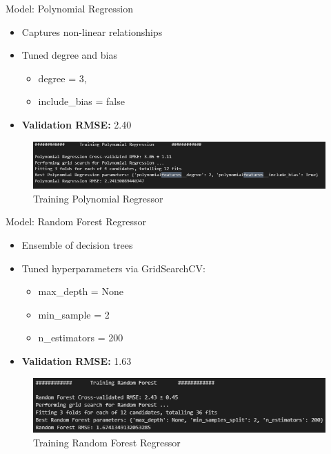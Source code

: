 \documentclass{beamer}
\begin{document}
\begin{frame}{Model: Polynomial Regression}
  \begin{itemize}
    \item Captures non-linear relationships
    \item Tuned degree and bias 
        \begin{itemize}
            \item degree = 3,
            \item include\_bias = false
        \end{itemize}  
    \item \textbf{Validation RMSE:} 2.40
  \end{itemize}
  \begin{figure}
\vfill
    \centering
    \includegraphics[width=0.6\linewidth]{images/pr.png}
    \caption{Training Polynomial Regressor}
    \label{fig:enter-label}
\end{figure}
\end{frame}

\begin{frame}{Model: Random Forest Regressor}
  \begin{itemize}
    \item Ensemble of decision trees
    \item Tuned hyperparameters via GridSearchCV:
        \begin{itemize}
            \item max\_depth = None
            \item min\_sample = 2
            \item n\_estimators = 200
        \end{itemize}  
    \item \textbf{Validation RMSE:} 1.63
  \end{itemize}
  \begin{figure}
\vfill
    \centering
    \includegraphics[width=0.6\linewidth]{images/rf.png}
    \caption{Training Random Forest Regressor}
    \label{fig:enter-label}
\end{figure}
\end{frame}
\end{document}
